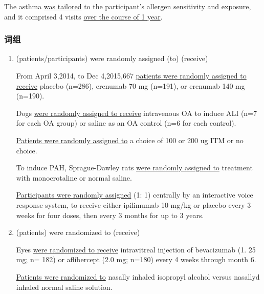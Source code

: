 \documentclass[a4paper]{ctexbook}
\begin{document}
    \begin{eg}{}
      The asthma  \uline{was tailored} to the participant's allergen sensitivity and exposure, and it comprised 4 visits \uline{over the course of 1 year}.
    \end{eg}

    \subsubsection{词组}

    \begin{enumerate}
      \item (patients/participants) were randomly assigned (to) (receive)
      \begin{eg}{}
        From April 3,2014, to Dec 4,2015,667 \uline{patients were randomly assigned to receive} placebo (n=286), erenumab 70 mg (n=191), or erenumab 140 mg (n=190).
      \end{eg}

      \begin{eg}{}
        Dogs \uline{were randomly assigned to receive} intravenous OA to induce ALI (n=7 for each OA group) or saline as an OA control (n=6 for each control).
      \end{eg}

      \begin{eg}{}
        \uline{Patients were randomly assigned to} a choice of 100 or 200 ug ITM or no choice.
      \end{eg}

      \begin{eg}{}
        To induce PAH, Sprague-Dawley rats \uline{were randomly assigned to} treatment with monocrotaline or normal saline.
      \end{eg}

      \begin{eg}{}
        \uline{Participants were randomly assigned} (1: 1) centrally by an interactive voice response system, to receive either ipilimumab 10 mg/kg or placebo every 3 weeks for four doses, then every 3 months for up to 3 years.
      \end{eg}
      
      \item (patients) were randomized to (receive)
      \begin{eg}{}
        Eyes \uline{were randomized to receive} intravitreal injection of bevacizumab (1. 25 mg; n= 182) or aflibercept (2.0 mg; n=180) every 4 weeks through month 6.
      \end{eg}
      \begin{eg}{}
        \uline{Patients were randomized to} nasally inhaled isopropyl alcohol versus nasallyd inhaled normal saline solution.
      \end{eg}


\end{enumerate}
\end{document}
